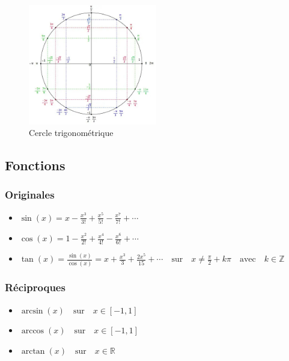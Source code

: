 \documentclass[12]{article}%
\theoremstyle{plain}
\theoremstyle{definition}
\theoremstyle{remark}
\begin{document}
\begin{figure}[h] %
	\centering
	\includegraphics[width=0.5\textwidth]{./images/cercle-trigonometrique.jpg} %
	\caption{Cercle trigonométrique}
	\label{fig:cercletrigo} %
\end{figure}
\newpage


\subsection{Fonctions}
\subsubsection{Originales}
\begin{itemize}
	\item \( \boxed{\sin(x) = x - \frac{x^3}{3!} + \frac{x^5}{5!} - \frac{x^7}{7!} + \cdots} \)
	\item \( \boxed{\cos(x) = 1 - \frac{x^2}{2!} + \frac{x^4}{4!} - \frac{x^6}{6!} + \cdots} \)
	\item \( \boxed{\tan(x) = \frac{\sin(x)}{\cos(x)} = x + \frac{x^3}{3} + \frac{2x^5}{15} + \cdots} \quad \text{sur} \quad x \neq \frac{\pi}{2} + k\pi \quad \text{avec} \quad k \in \mathbb{Z} \)
\end{itemize}

\subsubsection{Réciproques}
\begin{itemize}
	\item \( \boxed{\arcsin(x) \quad \text{sur} \quad x \in [-1,1]} \)
	\item \( \boxed{\arccos(x) \quad \text{sur} \quad x \in [-1,1]} \)
	\item \( \boxed{\arctan(x) \quad \text{sur} \quad x \in \mathbb{R}} \)
\end{itemize}
\end{document}
